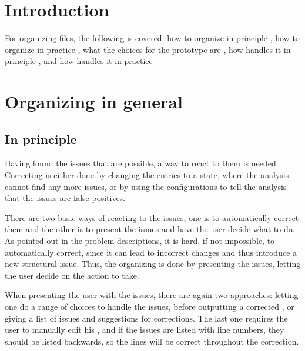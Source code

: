 
\section{Introduction}

For organizing {\bibtex} files, the following is covered: how to
organize in principle , how to
organize in practice , what the
choices for the prototype {\orangutan} are
, how {\orangutan} handles it
in principle , and how
{\orangutan} handles it in practice


\section{Organizing in general}

\subsection{In principle}
\label{sec:organizing_principle}

Having found the issues that are possible, a way to react to them is
needed.  Correcting is either done by changing the entries to a state,
where the analysis cannot find any more issues, or by using the
configurations to tell the analysis that the issues are false
positives.

There are two basic ways of reacting to the issues, one is to
automatically correct them and the other is to present the issues and
have the user decide what to do.  As pointed out in the problem
descriptions, it is hard, if not impossible, to automatically correct,
since it can lead to incorrect changes and thus introduce a new
structural issue.  Thus, the organizing is done by presenting the
issues, letting the user decide on the action to take.

When presenting the user with the issues, there are again two
approaches: letting one do a range of choices to handle the issues,
before outputting a corrected , or giving a list of issues
and suggestions for corrections.  The last one requires the user to
manually edit his , and if the issues are listed with line
numbers, they should be listed backwards, so the lines will be correct
throughout the correction.

